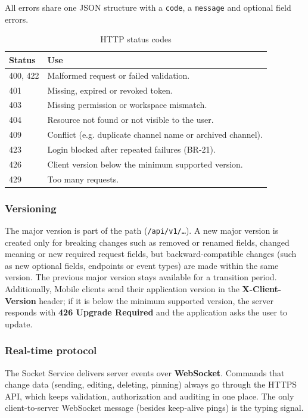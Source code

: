 \documentclass[
    english, %
]{VUMIFPSkursinis}
\begin{document}
All errors share one JSON structure with a \texttt{code}, a \texttt{message} and optional field errors.

\begin{table}[H]
\centering
\small
\caption{HTTP status codes}
\begin{tabular}{|p{}|p{}|}
\hline
\textbf{Status} & \textbf{Use} \\ \hline
400, 422 & Malformed request or failed validation. \\ \hline
401 & Missing, expired or revoked token. \\ \hline
403 & Missing permission or workspace mismatch. \\ \hline
404 & Resource not found or not visible to the user. \\ \hline
409 & Conflict (e.g. duplicate channel name or archived channel). \\ \hline
423 & Login blocked after repeated failures (BR-21). \\ \hline
426 & Client version below the minimum supported version. \\ \hline
429 & Too many requests. \\ \hline
\end{tabular}
\end{table}

\subsubsection{Versioning}
The major version is part of the path (\texttt{/api/v1/\ldots}). A new major version is created only for breaking changes such as removed or renamed fields, changed meaning or new required request fields, but backward-compatible changes (such as new optional fields, endpoints or event types) are made within the same version. The previous major version stays available for a transition period. Additionally, Mobile clients send their application version in the \textbf{X-Client-Version} header; if it is below the minimum supported version, the server responds with \textbf{426 Upgrade Required} and the application asks the user to update.

\subsubsection{Real-time protocol}
The Socket Service delivers server events over \textbf{WebSocket}. Commands that change data (sending, editing, deleting, pinning) always go through the HTTPS API, which keeps validation, authorization and auditing in one place. The only client-to-server WebSocket message (besides keep-alive pings) is the typing signal.
\end{document}
